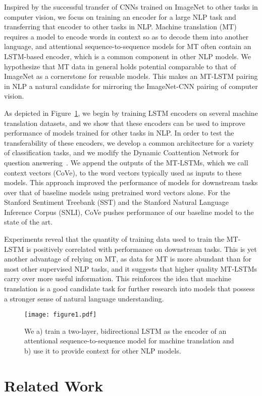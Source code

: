 \documentclass{article}
\begin{document}
Inspired by the successful transfer of CNNs trained on ImageNet to other tasks in computer vision,
we focus on training an encoder for a large NLP task and transferring that encoder to other tasks in NLP.
Machine translation (MT) requires a model to encode words in context so as to decode them into another language,
and attentional sequence-to-sequence models for MT often contain an LSTM-based encoder, 
which is a common component in other NLP models.
We hypothesize that MT data in general holds potential
comparable to that of ImageNet 
as a cornerstone for reusable models.
This makes an MT-LSTM pairing in NLP a natural candidate for mirroring the ImageNet-CNN pairing of computer vision.

As depicted in Figure~\ref{fig1}, 
we begin by training LSTM encoders on several machine translation datasets, 
and we show that these encoders can be used to improve performance of models trained for other tasks in NLP.
In order to test the transferability of these encoders, 
we develop a common architecture for a variety of classification tasks,
and we modify the Dynamic Coattention Network for question answering~\citep{Xiong2017}.
We append the outputs of the MT-LSTMs, 
which we call context vectors (CoVe), 
to the word vectors typically used as inputs to these models.
This approach improved the performance of models for downstream tasks over that of baseline models using pretrained word vectors alone.
For the Stanford Sentiment Treebank (SST) and the Stanford Natural Language Inference Corpus (SNLI),
CoVe pushes performance of our baseline model to the state of the art.

Experiments reveal that the quantity of training data used to train the MT-LSTM is positively correlated with performance on downstream tasks. 
This is yet another advantage of relying on MT, 
as data for MT is more abundant than for most other supervised NLP tasks, 
and it suggests that higher quality MT-LSTMs carry over more useful information.
This reinforces the idea that machine translation is a good candidate task for further research into models that possess a stronger sense of natural language understanding.

\begin{figure}
  \centering
 \texttt{[image: figure1.pdf]}
  \caption{We a) train a two-layer, bidirectional LSTM as the encoder of an attentional sequence-to-sequence model for machine translation and b) use it to provide context for other NLP models.
  }\label{fig1}
  \vspace{-0.3cm}
\end{figure} \section{Related Work}
\end{document}
